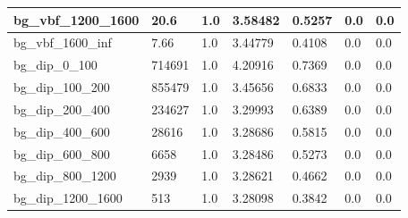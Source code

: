 \documentclass[a4paper, 10pt]{article}
\begin{document}
\begin{table}[H]
\begin{center}
\begin{tabular}{|m{23.0mm}|m{23.0mm}|m{18.0mm}|m{19.0mm}|m{19.0mm}|m{19.0mm}|m{19.0mm}|}
      \hline
      {\cellcolor{white}         bg\_vbf\_1200\_1600}& {\cellcolor{white}         20.6}& {\cellcolor{white}         1.0}& {\cellcolor{white}         3.58482}& {\cellcolor{white}         0.5257}& {\cellcolor{green}         0.0}& {\cellcolor{green}         0.0}\\
      \hline
      {\cellcolor{white}         bg\_vbf\_1600\_inf}& {\cellcolor{white}         7.66}& {\cellcolor{white}         1.0}& {\cellcolor{white}         3.44779}& {\cellcolor{white}         0.4108}& {\cellcolor{green}         0.0}& {\cellcolor{green}         0.0}\\
      \hline
      {\cellcolor{white}         bg\_dip\_0\_100}& {\cellcolor{white}         714691}& {\cellcolor{white}         1.0}& {\cellcolor{white}         4.20916}& {\cellcolor{white}         0.7369}& {\cellcolor{green}         0.0}& {\cellcolor{green}         0.0}\\
      \hline
      {\cellcolor{white}         bg\_dip\_100\_200}& {\cellcolor{white}         855479}& {\cellcolor{white}         1.0}& {\cellcolor{white}         3.45656}& {\cellcolor{white}         0.6833}& {\cellcolor{green}         0.0}& {\cellcolor{green}         0.0}\\
      \hline
      {\cellcolor{white}         bg\_dip\_200\_400}& {\cellcolor{white}         234627}& {\cellcolor{white}         1.0}& {\cellcolor{white}         3.29993}& {\cellcolor{white}         0.6389}& {\cellcolor{green}         0.0}& {\cellcolor{green}         0.0}\\
      \hline
      {\cellcolor{white}         bg\_dip\_400\_600}& {\cellcolor{white}         28616}& {\cellcolor{white}         1.0}& {\cellcolor{white}         3.28686}& {\cellcolor{white}         0.5815}& {\cellcolor{green}         0.0}& {\cellcolor{green}         0.0}\\
      \hline
      {\cellcolor{white}         bg\_dip\_600\_800}& {\cellcolor{white}         6658}& {\cellcolor{white}         1.0}& {\cellcolor{white}         3.28486}& {\cellcolor{white}         0.5273}& {\cellcolor{green}         0.0}& {\cellcolor{green}         0.0}\\
      \hline
      {\cellcolor{white}         bg\_dip\_800\_1200}& {\cellcolor{white}         2939}& {\cellcolor{white}         1.0}& {\cellcolor{white}         3.28621}& {\cellcolor{white}         0.4662}& {\cellcolor{green}         0.0}& {\cellcolor{green}         0.0}\\
      \hline
      {\cellcolor{white}         bg\_dip\_1200\_1600}& {\cellcolor{white}         513}& {\cellcolor{white}         1.0}& {\cellcolor{white}         3.28098}& {\cellcolor{white}         0.3842}& {\cellcolor{green}         0.0}& {\cellcolor{green}         0.0}\\

\end{tabular}
\end{center}
\end{table}
\end{document}
